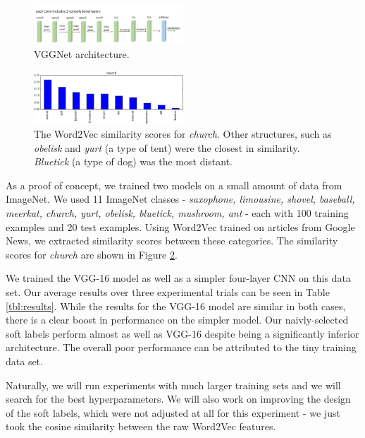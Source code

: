 \begin{figure}[!tb]
  \centering
  \includegraphics[width=0.5\textwidth]{figs/vgg16arch.png}
  \caption{
      VGGNet architecture.
  }
  \label{fig:word2vec_similarities}
\end{figure}

\begin{figure}[!tb]
  \centering
  \includegraphics[width=0.5\textwidth]{figs/word2vec_church.png}
  \caption{
    The Word2Vec similarity scores for \emph{church}. Other structures, such as
    \emph{obelisk} and \emph{yurt} (a type of tent) were the closest in
    similarity. \emph{Bluetick} (a type of dog) was the most distant.
  }
  \label{fig:word2vec_similarities}
\end{figure}

As a proof of concept, we trained two models on a small amount of data from
ImageNet. We used 11 ImageNet classes -
\emph{
  saxophone,
  limousine,
  shovel,
  baseball,
  meerkat,
  church,
  yurt,
  obelisk,
  bluetick,
  mushroom,
  ant
} -
each with 100 training examples and 20 test examples.
Using Word2Vec trained on articles from Google News, we extracted similarity
scores between these categories. The similarity scores for \emph{church} are
shown in Figure \ref{fig:word2vec_similarities}.

We trained the VGG-16 model as well as a simpler four-layer CNN on this data
set. Our average results over three experimental trials can be seen in Table
\ref{tbl:results}.
While the results for the VGG-16 model are similar in both cases, there is a
clear boost in performance on the simpler model. Our naivly-selected soft
labels perform almost as well as VGG-16 despite being a significantly inferior
architecture.
The overall poor performance can be attributed to the tiny training data set.

Naturally, we will run experiments with much larger training sets and we will
search for the best hyperparameters.
We will also work on improving the design of the soft labels, which were not
adjusted at all for this experiment - we just took the cosine similarity
between the raw Word2Vec features.


